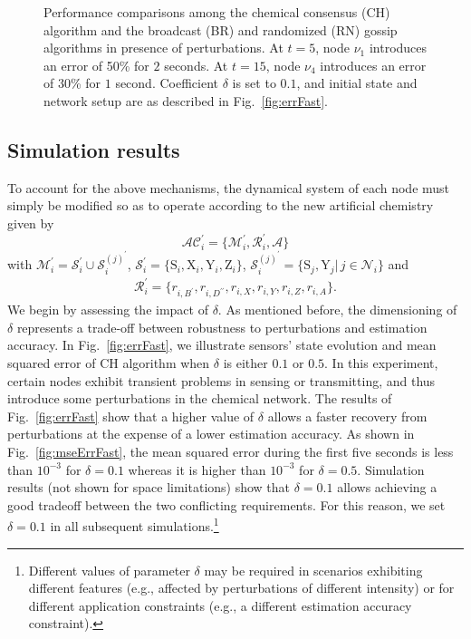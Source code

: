 \documentclass[journal]{IEEEtran}
\newcommand{\mol}[1]{\ensuremath{\textrm{#1}}}
\begin{document}
\begin{figure}[t]
 \centering
\caption{{Performance comparisons among the chemical consensus (CH) algorithm and the broadcast (BR) and randomized (RN) gossip algorithms in presence of perturbations. At $t=5$, node $\nu_1$ introduces an error of 50\% for $2$ seconds. At $t=15$, node $\nu_4$ introduces an error of 30\% for $1$ second. Coefficient $\delta$ is set to $0.1$, and initial state and network setup are as described in Fig.~\ref{fig:errFast}. }}
\label{fig:errComp}
\end{figure}

\subsection{Simulation results}

{To account for the above mechanisms, the dynamical system of each node must simply be modified so as to operate according to the new artificial chemistry given by 
\begin{equation}\label{pippo_finale}
\mathcal{AC}_i^{\prime}=\{\mathcal M_i^{\prime}, \mathcal R_i^{\prime}, \mathcal A\} 
\end{equation}
with $\mathcal M_i^{\prime} = \mathcal{S}_i^{\prime} \cup \mathcal{S}_i^{(j)^{\prime}}$, $\mathcal{S}_i^{\prime} = \{\mol{S}_i,\mol{X}_i,\mol{Y}_i, \mol{Z}_i\}$, $\mathcal{S}_i^{(j)^{\prime}} = \{\mol{S}_j,\mol{Y}_j|\,j \in\mathcal{N}_i\}$ and 
\begin{align} \label{pluto_finale}
\mathcal R_i^{\prime} = \{r_{i,B^{\prime}},r_{i,D^{\prime\prime}}, r_{i,X}, r_{i,Y},r_{i,Z}, r_{i,A}\}.
\end{align}} 
{We begin by assessing the impact of $\delta$. As mentioned before, the dimensioning of $\delta$ represents a trade-off between robustness to perturbations and estimation accuracy. In Fig.~\ref{fig:errFast}, we illustrate sensors' state evolution and mean squared error of CH algorithm when $\delta$ is either $0.1$ or $0.5$. 
In this experiment, certain nodes exhibit transient problems in sensing or transmitting, and thus introduce some perturbations in the chemical network.
The results of Fig.~\ref{fig:errFast} show that a higher value of $\delta$ allows a faster recovery from perturbations at the expense of a lower estimation accuracy. {As shown in Fig.~\ref{fig:mseErrFast}, the mean squared error during the first five seconds is less than $10^{-3}$ for $\delta=0.1$ whereas it is higher than $10^{-3}$ for $\delta=0.5$}. Simulation results (not shown for space limitations) show that $\delta = 0.1$ allows achieving a good tradeoff between the two conflicting requirements. For this reason, we set $\delta = 0.1$ in all subsequent simulations.\footnote{{Different values of parameter $\delta$ may be required in scenarios exhibiting different features (e.g., affected by perturbations of different intensity) or for different application constraints (e.g., a different estimation accuracy constraint).}}
} 
\end{document}

